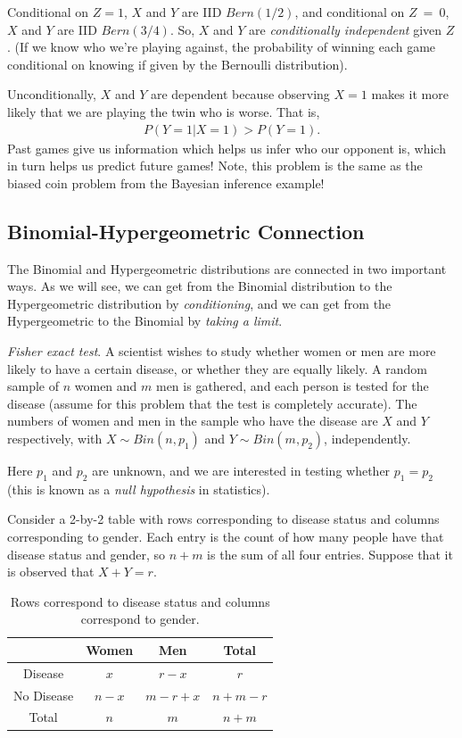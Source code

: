 Conditional on \(Z = 1\), 
\(X\) and \(Y\) are IID \(Bern(1/2)\), 
and conditional on \(Z\  = \ 0\), 
\(X\) and \(Y\) are IID \(Bern(3/4)\).
So, \(X\) and \(Y\) are \emph{conditionally independent} given \(Z\).
(If we know who we're playing against, 
the probability of winning each game conditional on 
knowing if given by the Bernoulli distribution).

Unconditionally, 
\(X\) and \(Y\) are dependent because observing \(X = 1\) 
makes it more likely that we are playing the twin who is worse. 
That is,
\begin{align}
P(Y = 1|X = 1) > P(Y = 1).
\end{align}
Past games give us information which helps us infer who our opponent is,
which in turn helps us predict future games! 
Note, this problem is the same as the biased coin problem from the Bayesian inference example!

\subsection{Binomial-Hypergeometric Connection}

The Binomial and Hypergeometric distributions are connected in two important ways. 
As we will see, 
we can get from the Binomial distribution to the Hypergeometric distribution by \emph{conditioning},
and we can get from the Hypergeometric to the Binomial by \emph{taking a limit}.

\emph{Fisher exact test}. 
A scientist wishes to study whether women or 
men are more likely to have a certain disease, 
or whether they are equally likely. 
A random sample of \(n\) women and \(m\) men is gathered, 
and each person is tested for the disease (assume for this problem that the test is completely accurate). 
The numbers of women and men in the sample who have the disease are \(X\) and \(Y\) respectively,
with \(X \sim Bin(n,p_{1})\) and \(Y \sim Bin(m,p_{2})\),
independently.

Here \(p_{1}\) and \(p_{2}\) are unknown, 
and we are interested in testing whether \(p_{1} = p_{2}\) (this is known as a \emph{null hypothesis} in statistics).

Consider a 2-by-2 table with rows corresponding to disease status and
columns corresponding to gender. 
Each entry is the count of how many
people have that disease status and gender, so \(n + m\) is the sum of all four entries. 
Suppose that it is observed that \(X + Y = r\).

\begin{table}[h!]
\centering
\begin{tabular}{| c | c | c | c |}
\hline
& Women & Men & Total \\\hline
Disease & $x$ & $r-x$ & $r$ \\\hline
No Disease & $n-x$ & $m-r+x$ & $n+m-r$ \\\hline
Total & $n$ & $m$ & $n+m$ \\\hline
\end{tabular}
\caption{%
Rows correspond to disease status and columns correspond to gender.
}
\end{table}

